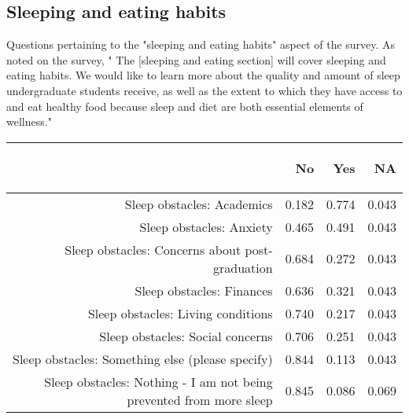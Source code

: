 \documentclass{article}\usepackage[]{graphicx}\usepackage[]{color}
\begin{document}
\subsection{Sleeping and eating habits}
Questions pertaining to the "sleeping and eating habits" aspect of the survey. As noted on the survey, "
The [sleeping and eating section] will cover sleeping and eating habits.  We would like to
learn more about the quality and amount of sleep undergraduate students receive,
as well as the extent to which they have access to and eat healthy food because
sleep and diet are both essential elements of wellness."
\begin{table}[ht]
\centering
\begin{tabular}{rrrr}
  \hline
 & \begin{sideways} No  \end{sideways} & \begin{sideways} Yes  \end{sideways} & \begin{sideways} NA  \end{sideways} \\ 
  \hline
Sleep obstacles: Academics & 0.182 & 0.774 & 0.043 \\ 
  Sleep obstacles: Anxiety & 0.465 & 0.491 & 0.043 \\ 
  Sleep obstacles: Concerns about post-graduation & 0.684 & 0.272 & 0.043 \\ 
  Sleep obstacles: Finances & 0.636 & 0.321 & 0.043 \\ 
  Sleep obstacles: Living conditions & 0.740 & 0.217 & 0.043 \\ 
  Sleep obstacles: Social concerns & 0.706 & 0.251 & 0.043 \\ 
  Sleep obstacles: Something else (please specify) & 0.844 & 0.113 & 0.043 \\ 
  Sleep obstacles: Nothing - I am not being prevented from more sleep & 0.845 & 0.086 & 0.069 \\ 
   \hline
\end{tabular}
\end{table}
\end{document}
